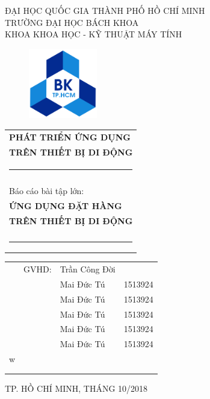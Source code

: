 \documentclass[a4paper]{article}
\begin{document}
\begin{titlepage}
\begin{center}
ĐẠI HỌC QUỐC GIA THÀNH PHỐ HỒ CHÍ MINH \\
TRƯỜNG ĐẠI HỌC BÁCH KHOA \\
KHOA KHOA HỌC - KỸ THUẬT MÁY TÍNH 
\end{center}

\vspace{1cm}

\begin{figure}[h!]
\begin{center}
\includegraphics[width=3cm]{hcmut.png}
\end{center}
\end{figure}


\vspace{1cm}



\begin{tabular}{l}


\textbf{\Large PHÁT TRIỂN ỨNG DỤNG}\\
\textbf{\Large TRÊN THIẾT BỊ DI ĐỘNG}

\\
\noindent\rule{13cm}{0.4pt}
\\
\\
\Large{Báo cáo bài tập lớn:}\\[2mm]
{\Huge \textbf{ỨNG DỤNG ĐẶT HÀNG}}\\
{\Huge \textbf{TRÊN THIẾT BỊ DI ĐỘNG}}\\
\\
\noindent\rule{13cm}{0.4pt}
\end{tabular}

\vspace{2cm}

\begin{table}[h]
\begin{tabular}{rrll}
\hspace{5 cm} & GVHD: & Trần Công Đời&\\
& & Mai Đức Tú  & 1513924 \\
& & Mai Đức Tú  & 1513924 \\
& & Mai Đức Tú  & 1513924 \\
& & Mai Đức Tú  & 1513924 \\
& & Mai Đức Tú  & 1513924 \\w
\\
\\
\\

\end{tabular}
\end{table}

\begin{center}
{\footnotesize TP. HỒ CHÍ MINH, THÁNG 10/2018}
\end{center}
\end{titlepage}
\end{document}

